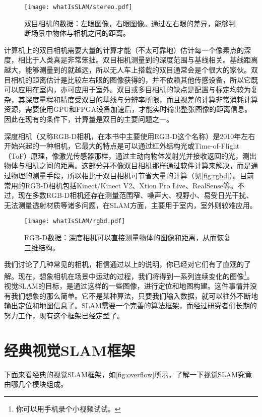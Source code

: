 \begin{figure}[!ht]
	\centering
	\texttt{[image: whatIsSLAM/stereo.pdf]}
	\caption{双目相机的数据：左眼图像，右眼图像。通过左右眼的差异，能够判断场景中物体与相机之间的距离。}
	\label{fig:stereo}
\end{figure}

计算机上的双目相机需要大量的计算才能（不太可靠地）估计每一个像素点的深度，相比于人类真是非常笨拙。双目相机测量到的深度范围与基线相关。基线距离越大，能够测量到的就越远，所以无人车上搭载的双目通常会是个很大的家伙。双目相机的距离估计是比较左右眼的图像获得的，并不依赖其他传感设备，所以它既可以应用在室内，亦可应用于室外。双目或多目相机的缺点是配置与标定均较为复杂，其深度量程和精度受双目的基线与分辨率所限，而且视差的计算非常消耗计算资源，需要使用GPU和FPGA设备加速后，才能实时输出整张图像的距离信息。因此在现有的条件下，计算量是双目的主要问题之一。

深度相机（又称RGB-D相机，在本书中主要使用RGB-D这个名称）是2010年左右开始兴起的一种相机，它最大的特点是可以通过红外结构光或Time-of-Flight（ToF）原理，像激光传感器那样，通过主动向物体发射光并接收返回的光，测出物体与相机之间的距离。这部分并不像双目相机那样通过软件计算来解决，而是通过物理的测量手段，所以相比于双目相机可节省大量的计算（见\autoref{fig:rgbd}）。目前常用的RGB-D相机包括Kinect/Kinect V2、Xtion Pro Live、RealSense等。不过，现在多数RGB-D相机还存在测量范围窄、噪声大、视野小、易受日光干扰、无法测量透射材质等诸多问题，在SLAM方面，主要用于室内，室外则较难应用。

\begin{figure}[!ht]
	\centering
	\texttt{[image: whatIsSLAM/rgbd.pdf]}
	\caption{RGB-D数据：深度相机可以直接测量物体的图像和距离，从而恢复三维结构。}
	\label{fig:rgbd}
\end{figure}

我们讨论了几种常见的相机，相信通过以上的说明，你已经对它们有了直观的了解。现在，想象相机在场景中运动的过程，我们将得到一系列连续变化的图像\footnote{你可以用手机录个小视频试试。}。视觉SLAM的目标，是通过这样的一些图像，进行定位和地图构建。这件事情并没有我们想象的那么简单。它不是某种算法，只要我们输入数据，就可以往外不断地输出定位和地图信息了。SLAM需要一个完善的算法框架，而经过研究者们长期的努力工作，现有这个框架已经定型了。

\section{经典视觉SLAM框架}
下面来看经典的视觉SLAM框架，如\autoref{fig:overflow}所示，了解一下视觉SLAM究竟由哪几个模块组成。

